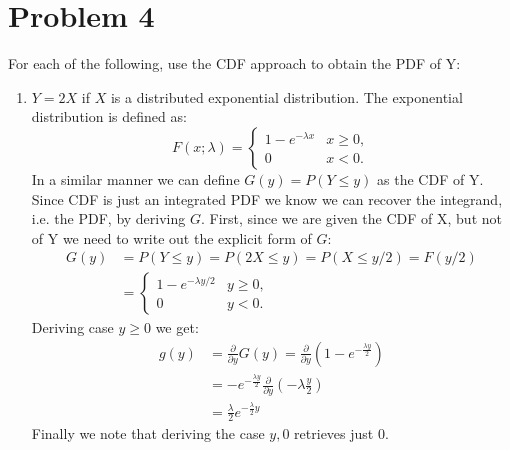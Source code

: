 \documentclass{article}
\newcommand{\1}{\mathbf{1}}
\begin{document}
	
\newpage
\section*{Problem 4}
For each of the following, use the CDF approach to obtain the PDF of Y:
\begin{enumerate}
    \item $Y=2X$ if $X$ is a distributed exponential distribution. The exponential distribution is defined as:
    $$
    F(x;\lambda) = \begin{cases}
                    1-e^{-\lambda x} & x \ge 0, \\
                    0 & x < 0.
                    \end{cases}
    $$
    In a similar manner we can define $G(y)=P(Y\leq y)$ as the CDF of Y. Since CDF is just an integrated PDF we know we can recover the integrand, i.e. the PDF, by deriving $G$. First, since we are given the CDF of X, but not of Y we need to write out the explicit form of $G$:
    \begin{align*}
        G(y) &= P(Y\leq y) = P(2X \leq y) = P(X \leq y/2) = F(y/2) \\
        & = \begin{cases}
            1-e^{-\lambda y/2} & y \ge 0, \\
            0 & y < 0.
           \end{cases}
    \end{align*}
    Deriving case $y\ge 0$ we get:
    \begin{align*}
        g(y) &= \frac{\partial}{\partial y} G(y) = \frac{\partial}{\partial y} \left( 1-e^{-\frac{\lambda y}{2}} \right) \\
             &=  -e^{-\frac{\lambda y}{2}}  \frac{\partial}{\partial y} \left( -\lambda \frac{y}{2} \right) \\
             &= \frac{\lambda}{2} e^{-\frac{\lambda}{2}y}
    \end{align*}
    Finally we note that deriving the case $y,0$ retrieves just $0$. 
    

\end{enumerate}
\end{document}
